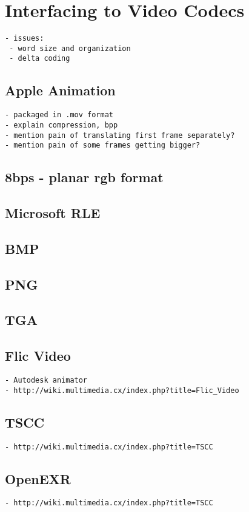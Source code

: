 \section{Interfacing to Video Codecs}
\label{sec:formats}

{\scriptsize
\begin{verbatim}
- issues:
 - word size and organization
 - delta coding
\end{verbatim}}

\subsection{Apple Animation}

{\scriptsize
\begin{verbatim}
- packaged in .mov format
- explain compression, bpp
- mention pain of translating first frame separately?
- mention pain of some frames getting bigger?
\end{verbatim}}

\subsection{8bps - planar rgb format}

\subsection{Microsoft RLE}

\subsection{BMP}

\subsection{PNG}

\subsection{TGA}

\subsection{Flic Video}

{\scriptsize
\begin{verbatim}
- Autodesk animator
- http://wiki.multimedia.cx/index.php?title=Flic_Video
\end{verbatim}}

\subsection{TSCC}

{\scriptsize
\begin{verbatim}
- http://wiki.multimedia.cx/index.php?title=TSCC
\end{verbatim}}

\subsection{OpenEXR}

{\scriptsize
\begin{verbatim}
- http://wiki.multimedia.cx/index.php?title=TSCC
\end{verbatim}}
